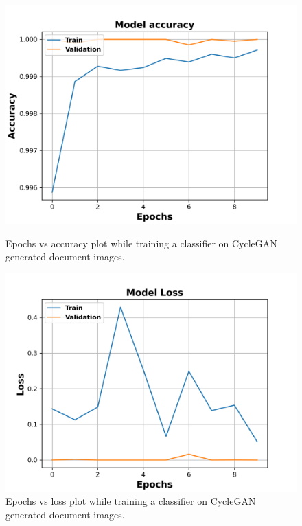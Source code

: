 \begin{figure}[H]
  \centering
  \begin{minipage}[b]{0.45\textwidth}
    \includegraphics[width=\textwidth]{images/Evaluation/CycleGAN_Generated_Data_Classifier_2021-06-02_21-55-39_Accuracy.png}
    \caption[Epochs vs accuracy plot while training a classifier on \ac{CycleGAN} generated document images.]{Epochs vs accuracy plot while training a classifier  on \ac{CycleGAN} generated document images.}
    \label{fig:CycleGANClassifierAcc}
  \end{minipage}
  \hfill
  \begin{minipage}[b]{0.45\textwidth}
    \includegraphics[width=\textwidth]{images/Evaluation/CycleGAN_Generated_Data_Classifier_2021-06-02_21-55-39_Loss.png}
    \caption[Epochs vs loss plot while training a classifier on \ac{CycleGAN} generated document images.]{Epochs vs loss plot while training a classifier on \ac{CycleGAN} generated document images.}
    \label{fig:CycleGANClassifierLoss}
  \end{minipage}
\end{figure}


